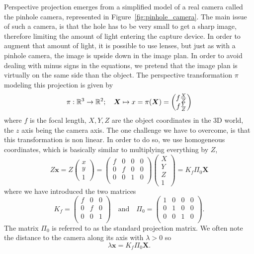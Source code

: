 Perspective projection emerges from a simplified model
of a real camera called the pinhole camera,
represented in Figure~\ref{fig:pinhole_camera}.
The main issue of such a camera,
is that the hole has to be very small to get a sharp image,
therefore limiting the amount of light entering the capture device.
In order to augment that amount of light, it is possible to use lenses,
but just as with a pinhole camera, the image is upside down in the image plan.
In order to avoid dealing with minus signs in the equations,
we pretend that the image plan is virtually on the same side than the object.
The perspective transformation $\pi$ modeling this projection is given by
\[ \pi : \mathbb{R}^3 \rightarrow \mathbb{R}^2; \quad
	\bm{X} \mapsto x = \pi(\bm{X}) =
	\begin{pmatrix}
		f \frac{X}{Z} \\
		f \frac{Y}{Z} \\
	\end{pmatrix}
\]
where $f$ is the focal length, $X,Y,Z$ are the object coordinates
in the 3D world, the $z$ axis being the camera axis.
The one challenge we have to overcome, is that this transformation is non linear.
In order to do so, we use homogeneous coordinates,
which is basically similar to multiplying everything by $Z$,
\[ Z \bm{x} = Z \begin{pmatrix} x \\ y \\ 1 \end{pmatrix} =
	\begin{pmatrix}
		f & 0 & 0 & 0 \\
		0 & f & 0 & 0 \\
		0 & 0 & 1 & 0 \\
	\end{pmatrix}
	\begin{pmatrix}
		X \\ Y \\ Z \\ 1
	\end{pmatrix}
	= K_f \Pi_0 \bm{X}
\]
where we have introduced the two matrices
\[K_f =
	\begin{pmatrix}
		f & 0 & 0 \\
		0 & f & 0 \\
		0 & 0 & 1 \\
	\end{pmatrix}
	\quad \text{and} \quad
	\Pi_0 =
	\begin{pmatrix}
		1 & 0 & 0 & 0 \\
		0 & 1 & 0 & 0 \\
		0 & 0 & 1 & 0 \\
	\end{pmatrix}.
\]
The matrix $\Pi_0$ is referred to as the standard projection matrix.
We often note the distance to the camera along its axis with $\lambda > 0$ so
\[
	\lambda \bm{x} = K_f \Pi_0 \bm{X}.
\]


